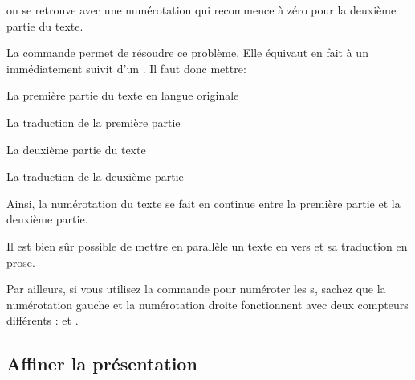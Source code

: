 {on se retrouve avec une numérotation qui recommence à zéro pour la deuxième partie du texte. 

La commande  permet de résoudre ce problème. Elle équivaut en fait à un  immédiatement suivit d'un . Il faut donc mettre: 

\begin{latexcode}
\begin{pages}  
    \begin{Leftside}  \beginnumbering 
La première partie du texte en langue originale
 \end{Leftside} %
 
\begin{Rightside} \beginnumbering
La traduction de la première partie
 \end{Rightside} %
 \Pages
 
\begin{Leftside} \memorydump %
La deuxième partie du texte 
\endnumbering  \end{Leftside}
    
\begin{Rightside}  \memorydump %
La traduction de la deuxième partie
\endnumbering \end{Rightside}   %
 
 \Pages

  \end{pages}
\end{latexcode}

Ainsi, la numérotation du texte se fait en continue entre la première partie et la deuxième partie.


\begin{plusloins}
Il est bien sûr possible de mettre en parallèle un texte en vers et sa traduction en prose. 

Par ailleurs, si vous utilisez la commande  pour numéroter les s, sachez que la numérotation gauche et la numérotation droite fonctionnent avec deux compteurs différents :  et .
\end{plusloins}




\subsection{Affiner la présentation}


}

